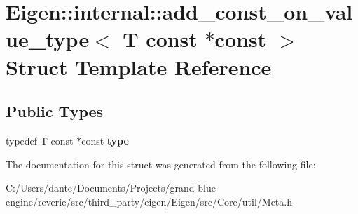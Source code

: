 \hypertarget{struct_eigen_1_1internal_1_1add__const__on__value__type_3_01_t_01const_01_5const_01_4}{}\section{Eigen\+::internal\+::add\+\_\+const\+\_\+on\+\_\+value\+\_\+type$<$ T const $\ast$const $>$ Struct Template Reference}
\label{struct_eigen_1_1internal_1_1add__const__on__value__type_3_01_t_01const_01_5const_01_4}
\subsection*{Public Types}
\begin{DoxyCompactItemize}
\item 
\mbox{\label{struct_eigen_1_1internal_1_1add__const__on__value__type_3_01_t_01const_01_5const_01_4_a66b342b16d4c3ea451460b1ca97f968f}} 
typedef T const  $\ast$const {\bfseries type}
\end{DoxyCompactItemize}


The documentation for this struct was generated from the following file\+:\begin{DoxyCompactItemize}
\item 
C\+:/\+Users/dante/\+Documents/\+Projects/grand-\/blue-\/engine/reverie/src/third\+\_\+party/eigen/\+Eigen/src/\+Core/util/Meta.\+h\end{DoxyCompactItemize}
